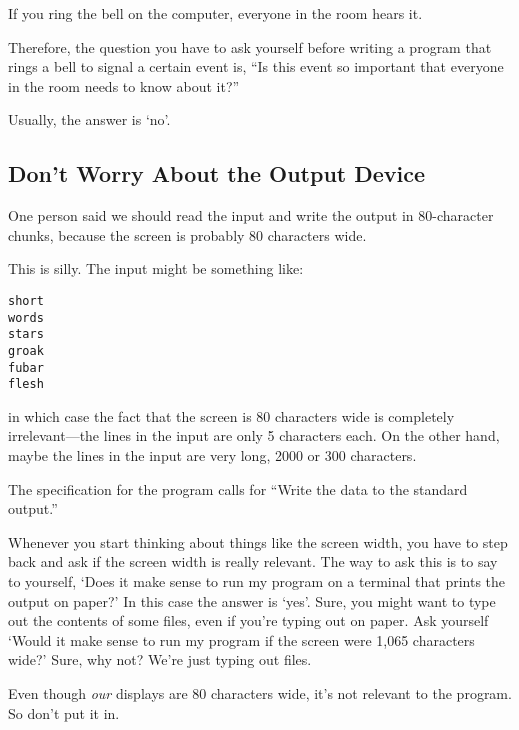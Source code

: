 If you ring the bell on the computer, everyone in the room hears it.

Therefore, the question you have to ask yourself before writing a
program that rings a bell to signal a certain event is, ``Is this event
so important that everyone in the room needs to know about it?''

Usually, the answer is `no'.

\subsection{Don't Worry About the Output Device}

One person said we should read the input and write the output in
80-character chunks, because the screen is probably 80 characters wide.

This is silly.  The input might be something like:

\begin{verbatim}
short
words
stars
groak
fubar
flesh
\end{verbatim}

\noindent in which case the fact that the screen is 80 characters wide is
completely irrelevant---the lines in the input are only 5 characters
each.  On the other hand, maybe the lines in the input are very long,
2000 or 300 characters.  

The specification for the program calls for ``Write the data to the
standard output.''

Whenever you start thinking about things like the screen width, you have
to step back and ask if the screen width is really relevant.  The way to
ask this is to say to yourself, `Does it make sense to run my program on
a terminal that prints the output on paper?'  In this case the answer is
`yes'.  Sure, you might want to type out the contents of some files,
even if you're typing out on paper.  Ask yourself `Would it make sense
to run my program if the screen were 1,065 characters wide?'  Sure, why
not?  We're just typing out files.

Even though {\em our}\/ displays are 80 characters wide, it's not
relevant to the program.  So don't put it in.
